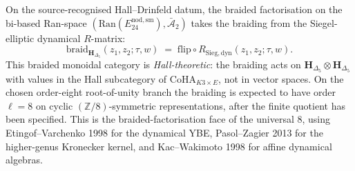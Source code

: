 \begin{remark}
\label{rem:bfac-siegel-dynamical-braiding}
On the source-recognised Hall--Drinfeld datum, the braided
factorisation on the bi-based Ran-space
$(\mathrm{Ran}(E^{\mathrm{nod,sm}}_{24}),\bar{\mathcal A}_2)$ takes the
braiding from the Siegel-elliptic dynamical $R$-matrix:
\[
\mathrm{braid}_{\mathbf H_{\Delta_5}}(z_1,z_2;\tau,w) \;=\; \mathrm{flip}\circ R_{\mathrm{Sieg,dyn}}(z_1,z_2;\tau,w).
\]
This braided monoidal category is \emph{Hall-theoretic}: the braiding
acts on $\mathbf H_{\Delta_5}\otimes\mathbf H_{\Delta_5}$ with values
in the Hall subcategory of $\mathrm{CoHA}_{K3\times E}$, not in vector
spaces. On the chosen order-eight root-of-unity branch the braiding is
expected to have order \(\ell=8\) on cyclic \((\mathbb Z/8)\)-symmetric
representations, after the finite quotient has been specified. This is the
braided-factorisation face of the universal $8$, using
Etingof--Varchenko 1998 for the dynamical YBE, Pasol--Zagier 2013 for
the higher-genus Kronecker kernel, and Kac--Wakimoto 1998 for affine
dynamical algebras.
\end{remark}

